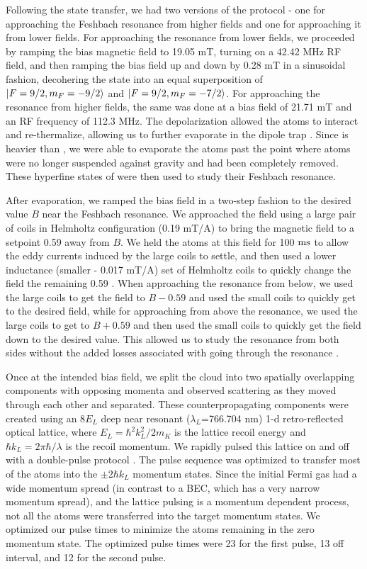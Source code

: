 \documentclass[12pt]{iopart}
\begin{document}
\par Following the state transfer, we had two versions of the protocol - one for approaching the Feshbach resonance from higher fields and one for approaching it from lower fields. For approaching the resonance from lower fields, we proceeded by ramping the bias magnetic field to 19.05 mT, turning on a 42.42 MHz RF field, and then ramping the bias field up and down by 0.28 mT in a sinusoidal fashion, decohering the \K{} state into an equal superposition of $\mathinner{|{F=9/2,m_F=-9/2}\rangle}$ and $\mathinner{|{F=9/2,m_F=-7/2}\rangle}$. For approaching the resonance from higher fields, the same was done at a bias field of 21.71 mT and an RF frequency of 112.3 MHz. The depolarization allowed the \K{} atoms to interact and re-thermalize, allowing us to further evaporate in the dipole trap \cite{DeMarco99}. Since \Rb{} is heavier than \K{}, we were able to evaporate the \K{} atoms past the point where \Rb{} atoms were no longer suspended against gravity and had been completely removed.  These hyperfine states of \K{} were then used to study their Feshbach resonance. 
\par After evaporation, we ramped the bias field in a two-step fashion to the desired value $B$ near the Feshbach resonance. We approached the field using a large pair of  coils in Helmholtz configuration (0.19 mT/A) to bring the magnetic field to a setpoint 0.59 \mT{} away from $B$. We held the atoms at this field for 100 $\rm{ms}$ to allow the eddy currents induced by the large coils to settle, and then used a lower inductance (smaller - 0.017 mT/A) set of Helmholtz coils to quickly change the field the remaining 0.59 \mT{}. When approaching the resonance from below, we used the large coils to get the field to $B-0.59$ \mT{} and used the small coils to quickly get to the desired field, while for approaching from above the resonance, we used the large coils to get to $B+0.59$  \mT{} and then used the small coils to quickly get the field down to the desired value. This allowed us to study the resonance from both sides without the added losses associated with going through the resonance \cite{Chin10}.
\par Once at the intended bias field, we split the cloud into two spatially overlapping components with opposing momenta  and observed scattering as they moved through each other and separated. These counterpropagating components were created using an  8$E_L$ deep near resonant ($\lambda_L$=766.704 nm) 1-d retro-reflected optical lattice, where $E_L=\hbar^2 k_L^2/2m_K$ is the lattice recoil energy and $\hbar k_L=2\pi \hbar/ \lambda$ is the recoil momentum. We rapidly pulsed this lattice on and off with a double-pulse protocol \cite{Wu05, Edwards10}. The pulse sequence was optimized to transfer most of the atoms into the $\pm 2 \hbar k_L$ momentum states. Since the initial Fermi gas had a wide momentum spread (in contrast to a BEC, which has a very narrow momentum spread), and the lattice pulsing is a momentum dependent process, not all the atoms were transferred into the target momentum states. We optimized our pulse times to minimize the atoms remaining in the zero momentum state. The optimized pulse times were 23 \us{} for the first pulse, 13 \us{} off interval, and 12 \us{} for the second pulse.
\end{document}
